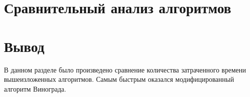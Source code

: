 \begin{figure}[ht!]
\end{figure}

\section{Сравнительный анализ алгоритмов}

\section{Вывод}

В данном разделе было произведено сравнение количества затраченного вре­мени вышеизложенных алгоритмов.
Самым быстрым оказался модифицированный алгоритм Винограда.